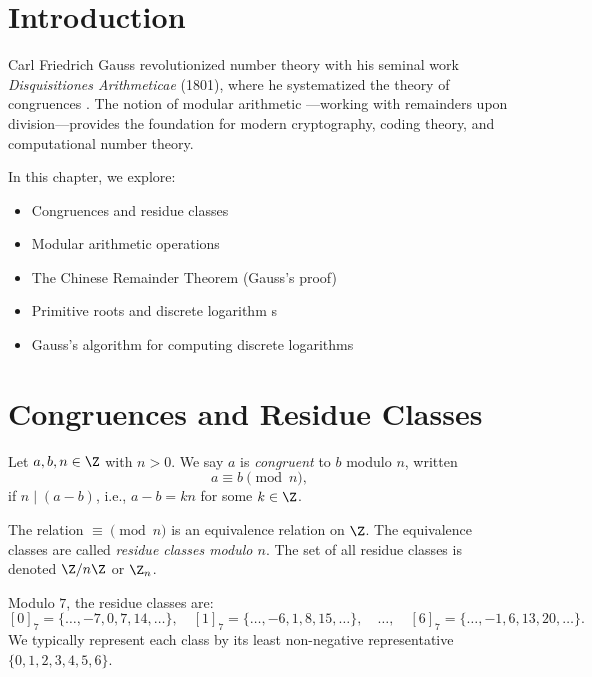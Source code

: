 \section{Introduction}

Carl Friedrich Gauss revolutionized number theory with his seminal work \textit{Disquisitiones Arithmeticae} (1801), where he systematized the theory of congruences . The notion of modular arithmetic ---working with remainders upon division---provides the foundation for modern cryptography, coding theory, and computational number theory.

In this chapter, we explore:
\begin{itemize}
    \item Congruences and residue classes 
    \item Modular arithmetic operations
    \item The Chinese Remainder Theorem  (Gauss's proof)
    \item Primitive roots and discrete logarithm s
    \item Gauss's algorithm for computing discrete logarithms
\end{itemize}

\section{Congruences and Residue Classes}

\begin{definition}[Congruence]
Let $a, b, n \in \Z$ with $n > 0$. We say $a$ is \textit{congruent} to $b$ modulo $n$, written
\[
a \equiv b \pmod{n},
\]
if $n \mid (a - b)$, i.e., $a - b = kn$ for some $k \in \Z$.
\end{definition}

The relation $\equiv \pmod{n}$ is an equivalence relation on $\Z$. The equivalence classes are called \textit{residue classes modulo $n$}. The set of all residue classes is denoted $\Z/n\Z$ or $\Z_n$.

\begin{example}
Modulo $7$, the residue classes are:
\[
[0]_7 = \{\ldots, -7, 0, 7, 14, \ldots\},\quad
[1]_7 = \{\ldots, -6, 1, 8, 15, \ldots\},\quad \ldots,\quad
[6]_7 = \{\ldots, -1, 6, 13, 20, \ldots\}.
\]
We typically represent each class by its least non-negative representative $\{0, 1, 2, 3, 4, 5, 6\}$.
\end{example}


